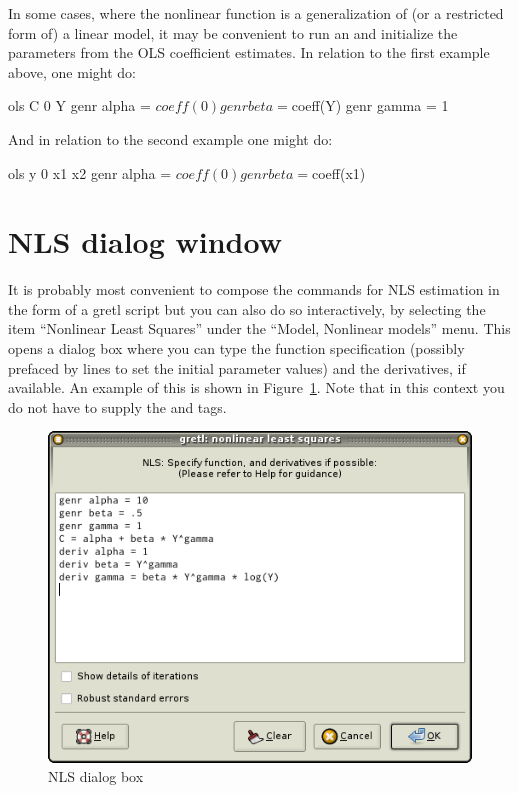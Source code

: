 In some cases, where the nonlinear function is a generalization of (or
a restricted form of) a linear model, it may be convenient to run an
 and initialize the parameters from the OLS coefficient
estimates.  In relation to the first example above, one might do:
%
\begin{code}
ols C 0 Y
genr alpha = $coeff(0)
genr beta = $coeff(Y)
genr gamma = 1
\end{code}

And in relation to the second example one might do:
%
\begin{code}
ols y 0 x1 x2
genr alpha = $coeff(0)
genr beta = $coeff(x1)
\end{code}

\section{NLS dialog window}
\label{nls-gui}

It is probably most convenient to compose the commands for NLS
estimation in the form of a gretl script but you can also do so
interactively, by selecting the item ``Nonlinear Least Squares'' under
the ``Model, Nonlinear models'' menu.  This opens a dialog box where you can
type the function specification (possibly prefaced by  lines to set
the initial parameter values) and the derivatives, if available.  An
example of this is shown in Figure~\ref{fig-nls-dialog}.  Note that in
this context you do not have to supply the  and 
tags.

\begin{figure}[htbp]
  \begin{center}
    \includegraphics[scale=0.5]{figures/nls_window}
  \end{center}
  \caption{NLS dialog box}
  \label{fig-nls-dialog}
\end{figure}

